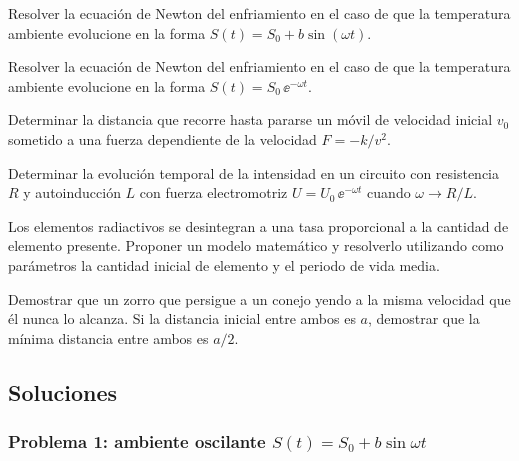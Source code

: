 \begin{problema}
Resolver la ecuación de Newton del enfriamiento en el caso de que la temperatura ambiente evolucione en la forma $S(t)=S_0+b\sin(\omega t)$.
\end{problema}
\begin{problema}
Resolver la ecuación de Newton del enfriamiento en el caso de que la temperatura ambiente evolucione en la forma $S(t)=S_0\,\ee^{-\omega t}$.
\end{problema}
\begin{problema}
Determinar la distancia que recorre hasta pararse un móvil de velocidad inicial $v_0$ sometido a una fuerza dependiente de la velocidad $F=-k/v^2$.
\end{problema}
\begin{problema}
Determinar la evolución temporal de la intensidad en un circuito con resistencia $R$ y autoinducción $L$ con fuerza electromotriz $U=U_0\,\ee^{-\omega t}$ cuando $\omega\to R/L$.
\end{problema}
\begin{problema}
Los elementos radiactivos se desintegran a una tasa proporcional a la cantidad de elemento presente. Proponer un modelo matemático y resolverlo utilizando como parámetros la cantidad inicial de elemento y el periodo de vida media.
\end{problema}
\begin{problema}
Demostrar que un zorro que persigue a un conejo yendo a la misma velocidad que él nunca lo alcanza. Si la distancia inicial entre ambos es $a$, demostrar que la mínima distancia entre ambos es $a/2$.
\end{problema}

\subsection{Soluciones}

\subsubsection*{Problema 1: ambiente oscilante $S(t)=S_0+b\sin\omega t$}

